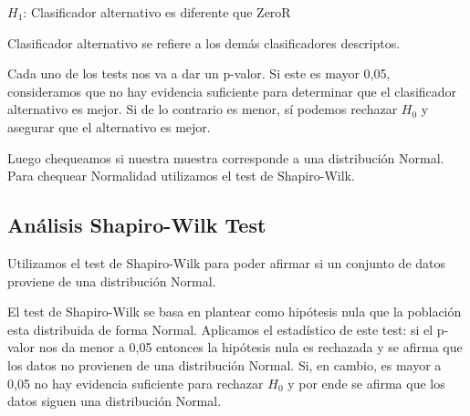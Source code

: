 \hspace{2cm}$H_1$: Clasificador alternativo es diferente que ZeroR
\vspace{0.5cm}

Clasificador alternativo se refiere a los demás clasificadores descriptos. 

Cada uno de los tests nos va a dar un p-valor. Si este es mayor 0,05, consideramos que no hay evidencia suficiente para determinar que el clasificador alternativo es mejor. Si de lo contrario es menor, sí podemos rechazar $H_0$ y asegurar que el alternativo es mejor. 

Luego chequeamos si nuestra muestra corresponde a una distribución Normal. Para chequear Normalidad utilizamos el test de Shapiro-Wilk.

\subsection{Análisis Shapiro-Wilk Test}



Utilizamos el test de Shapiro-Wilk para poder afirmar si un conjunto de datos proviene de una distribución Normal.


El test de Shapiro-Wilk se basa en plantear como hipótesis nula que la población esta distribuida de forma Normal. Aplicamos el estadístico de este test: si el p-valor nos da menor a 0,05 entonces la hipótesis nula es rechazada y se afirma que los datos no provienen de una distribución Normal. Si, en cambio, es mayor a 0,05 no hay evidencia suficiente para rechazar $H_0$ y por ende se afirma que los datos siguen una distribución Normal.

